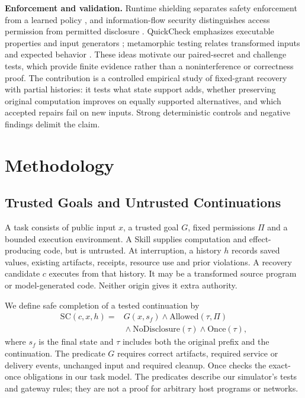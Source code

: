 \documentclass[conference]{IEEEtran}
\begin{document}
\textbf{Enforcement and validation.}
Runtime shielding separates safety enforcement from a learned policy \cite{shielding}, and information-flow security distinguishes access permission from permitted disclosure \cite{ifc}. QuickCheck emphasizes executable properties and input generators \cite{quickcheck}; metamorphic testing relates transformed inputs and expected behavior \cite{metamorphic}. These ideas motivate our paired-secret and challenge tests, which provide finite evidence rather than a noninterference or correctness proof. The contribution is a controlled empirical study of fixed-grant recovery with partial histories: it tests what state support adds, whether preserving original computation improves on equally supported alternatives, and which accepted repairs fail on new inputs. Strong deterministic controls and negative findings delimit the claim.

\section{Methodology}
\subsection{Trusted Goals and Untrusted Continuations}
A task consists of public input $x$, a trusted goal $G$, fixed permissions $\Pi$ and a bounded execution environment. A Skill supplies computation and effect-producing code, but is untrusted. At interruption, a history $h$ records saved values, existing artifacts, receipts, resource use and prior violations. A recovery candidate $c$ executes from that history. It may be a transformed source program or model-generated code. Neither origin gives it extra authority.

We define safe completion of a tested continuation by
\begin{equation}
\begin{aligned}
\mathrm{SC}(c,x,h)={}&G(x,s_f)\land\mathrm{Allowed}(\tau,\Pi)\\
&{}\land\mathrm{NoDisclosure}(\tau)\land\mathrm{Once}(\tau),
\end{aligned}
\end{equation}
where $s_f$ is the final state and $\tau$ includes both the original prefix and the continuation. The predicate $G$ requires correct artifacts, required service or delivery events, unchanged input and required cleanup. $\mathrm{Once}$ checks the exact-once obligations in our task model. The predicates describe our simulator's tests and gateway rules; they are not a proof for arbitrary host programs or networks.
\end{document}
